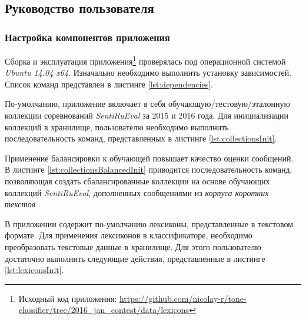 \subsection{Руководство пользователя}
    \subsubsection{Настройка компонентов приложения}
    Сборка и эксплуатация приложения\footnote{Исходный код приложения:
            \url{https://github.com/nicolay-r/tone-classifier/tree/2016_jan_contest/data/lexicons}
    }
    проверялась под операционной системой
    {\it Ubuntu 14.04 x64}.
    Изначально необходимо выполнить установку зависимостей.
    Список команд представлен в листинге \ref{lst:dependencies}.
    \lstset{style=bash}
    

        По-умолчанию, приложение включает в себя обучающую/тестовую/эталонную
        коллекции соревнований {\it SentiRuEval} за 2015 и 2016 года. Для
        инициализации коллекций в хранилище, пользователю необходимо выполнить
        последовательность команд, представленных в листинге \ref{lst:collectionsInit}.
        \lstset{style=bash}
        

        Применение балансировки к обучающей повышает качество оценки сообщений.
        \cite{diploma2015} В листинге \ref{lst:collectionsBalancedInit} приводится
        последовательность команд, позволяющая создать сбалансированные коллекции
        на основе обучающих коллекций {\it SentiRuEval}, дополненных сообщениями
        из {\it корпуса коротких текстов} \cite{rubtsovaCollection}.
        \lstset{style=bash}
        

        В приложении содержит по-умолчанию лексиконы, представленные в текстовом
        формате. Для применения лексиконов в классификаторе, необходимо преобразовать
        текстовые данные в хранилище. Для этого пользователю
        достаточно выполнить следующие действия, представленные в листинге
        \ref{lst:lexiconsInit}.
        \lstset{style=bash}
        

